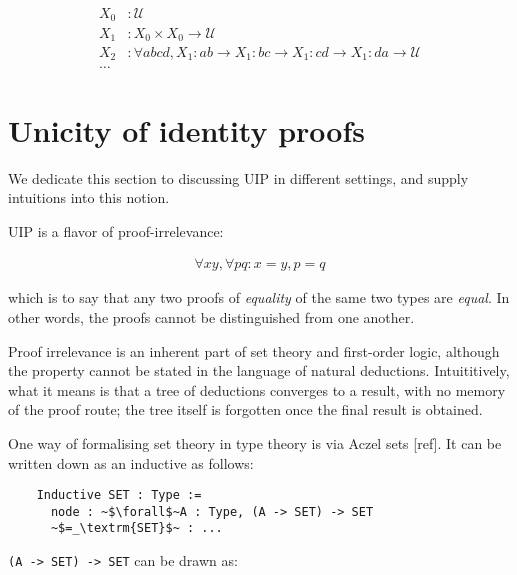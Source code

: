 \documentclass[10pt]{art}
\newcommand{\UU}{\ensuremath{\mathscr{U}}}
\begin{document}
\begin{align*}
  X_0 & : \UU                                                                                                      \\
  X_1 & : X_0 \times X_0 \rightarrow \UU                                                                           \\
  X_2 & : \forall a b c d, X_1 : ab \rightarrow X_1 : bc \rightarrow X_1 : cd \rightarrow X_1 : da \rightarrow \UU \\
  \ldots
\end{align*}

\section{Unicity of identity proofs\label{sec:uip}}
We dedicate this section to discussing UIP in different settings, and supply intuitions into this notion.

UIP is a flavor of proof-irrelevance:

\begin{align*}
  \forall x y, \forall p q : x = y, p = q
\end{align*}

which is to say that any two proofs of \emph{equality} of the same two types are \emph{equal}. In other words, the proofs cannot be distinguished from one another.

Proof irrelevance is an inherent part of set theory and first-order logic, although the property cannot be stated in the language of natural deductions. Intuititively, what it means is that a tree of deductions converges to a result, with no memory of the proof route; the tree itself is forgotten once the final result is obtained.

One way of formalising set theory in type theory is via Aczel sets [ref]. It can be written down as an inductive as follows:

\begin{listing}[H]
  \begin{verbatim}
    Inductive SET : Type :=
      node : ~$\forall$~A : Type, (A -> SET) -> SET
      ~$=_\textrm{SET}$~ : ...
  \end{verbatim}
\end{listing}

\texttt{(A -> SET) -> SET} can be drawn as:
\end{document}
